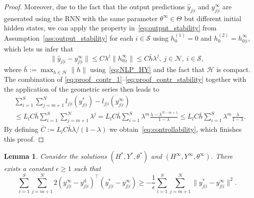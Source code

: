 \documentclass{article} %
\newtheorem{lem}{Lemma}
\begin{document}
\begin{proof}
	Moreover, due to the fact that the output predictions $\hat{y}_{j|i}$ and ${y}^\infty_{j|i}$ are generated using the RNN with the same parameter $\theta^\infty\in\Theta$ but different initial hidden states, we can apply the property in~\eqref{eq:output_stability} from Assumption~\ref{ass:output_stability} for each $i\in\mathcal{S}$ using $h_0^{(1)} = 0$ and $h_0^{(2)}=h^\infty_{0|i}$, which lets us infer that
	\begin{equation}\label{eq:proof_contr_stability}
		\|\hat{y}_{j|i}-{y}^\infty_{j|i}\| \leq  C\lambda^j\|h^\infty_{0|i}\| \leq C\bar{h}\lambda^j,\ j\in\mathcal{N}, \ i\in\mathcal{S},
	\end{equation}
	where $\bar{h}:=\max_{h\in\mathcal{H}}\|h\|$ using~\eqref{eq:NLP_HY} and the fact that $\mathcal{H}$ is compact.
	The combination of \eqref{eq:proof_contr_1}--\eqref{eq:proof_contr_stability} together with the application of the geometric series then leads to
	\begin{align*}
		&\sum_{i=1}^{S}\sum_{j=m+1}^{N}l_{j|i}({y}^*_{j|i})-l_{j|i}({y}^\infty_{j|i})\\
		&\leq L_lC\bar{h}\sum_{i=1}^{S}\sum_{j=m+1}^{N}\lambda^j
		 = L_lC\bar{h}\sum_{i=1}^{S}\lambda^m\frac{\lambda-\lambda^{N-m+1}}{1-\lambda}
		\leq L_lC\bar{h}\sum_{i=1}^{S}\lambda^{m}\frac{\lambda}{1-\lambda}.
	\end{align*}
	By defining $\bar{C}:=L_lC\bar{h}\lambda/({1-\lambda})$ we obtain~\eqref{eq:controllability}, which finishes this proof. 
\end{proof}

\begin{lem}\label{lem:opti}
	Consider the solutions $(H^*,Y^*,\theta^*)$ and $(H^\infty,Y^\infty,\theta^\infty)$. There exists a constant $\epsilon\geq 1$ such that
	\begin{equation}\label{eq:lem_opt}
		\sum_{i=1}^{S}\sum_{j=m+1}^{N} 2({y}_{j|i}^\infty-{y}_{j|i}^\mathrm{d})^\top({y}_{j|i}^*-{y}_{j|i}^\infty) \geq-\frac{1}{\epsilon}\sum_{i=1}^{S}\sum_{j=m+1}^{N}\|{y}_{j|i}^*-{y}_{j|i}^\infty\|^2.
	\end{equation}
\end{lem}
\end{document}

